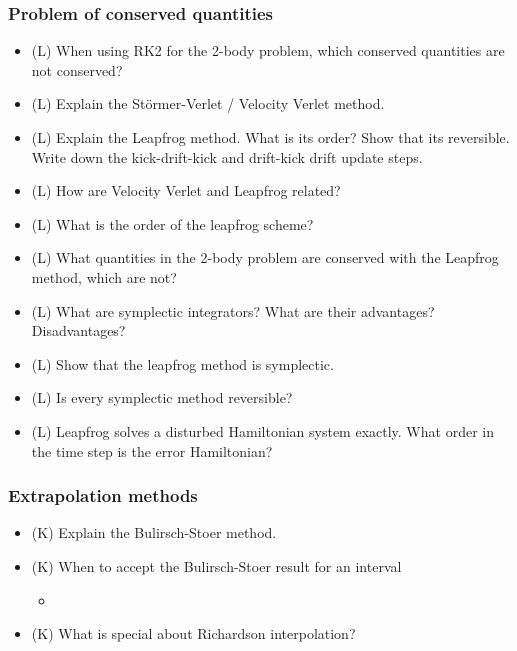 \subsubsection*{Problem of conserved quantities}
\begin{itemize}
    \item (L) When using RK2 for the 2-body problem, which conserved quantities are not conserved?
    \answerboxS
    \item (L) Explain the Störmer-Verlet / Velocity Verlet method.
    \answerboxL
    \item (L) Explain the Leapfrog method. What is its order? Show that its reversible.
    Write down the kick-drift-kick and drift-kick drift update steps.
    \answerboxL
    \item (L) How are Velocity Verlet and Leapfrog related?
    \answerboxM
    \item (L) What is the order of the leapfrog scheme?
    \answerboxS
    \item (L) What quantities in the 2-body problem are conserved with the Leapfrog method, which are not?
    \answerboxS
    \item (L) What are symplectic integrators? What are their advantages? Disadvantages?
    \answerboxM
    \item (L) Show that the leapfrog method is symplectic.
    \answerboxM
    \item (L) Is every symplectic method reversible?
    \answerboxS
    \item (L) Leapfrog solves a disturbed Hamiltonian system exactly. What order in the time step is the error Hamiltonian?
    \answerboxM
\end{itemize}

\subsubsection*{Extrapolation methods}
\begin{itemize}
    \item (K) Explain the Bulirsch-Stoer method.
    \answerboxL
    \item (K) When to accept the Bulirsch-Stoer result for an interval
    \begin{itemize}
        \item {}
    \end{itemize}
    \answerboxS
    \item (K) What is special about Richardson interpolation?
    \answerboxM
\end{itemize}

